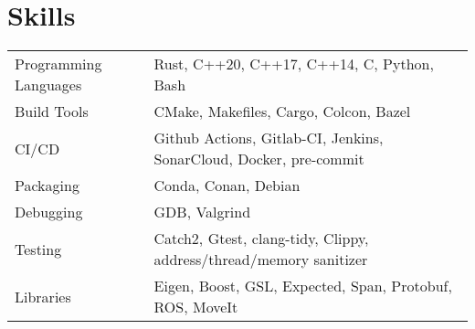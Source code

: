 \documentclass[a4paper,12pt]{article}
\begin{document}
\section{Skills}
\begin{tabularx}{\linewidth}{@{}l X@{}}
Programming Languages &  \normalsize{Rust, C++20, C++17, C++14, C, Python, Bash}\\
Build Tools &  \normalsize{CMake, Makefiles, Cargo, Colcon, Bazel}\\
CI\slash CD  &  \normalsize{Github Actions, Gitlab-CI, Jenkins, SonarCloud, Docker, pre-commit}\\
Packaging  &  \normalsize{Conda, Conan, Debian}\\
Debugging  &  \normalsize{GDB, Valgrind}\\
Testing  &  \normalsize{Catch2, Gtest, clang-tidy, Clippy, address\slash thread\slash memory sanitizer}\\
Libraries  &  \normalsize{Eigen, Boost, GSL, Expected, Span, Protobuf, ROS, MoveIt}\\
\end{tabularx}
\end{document}
